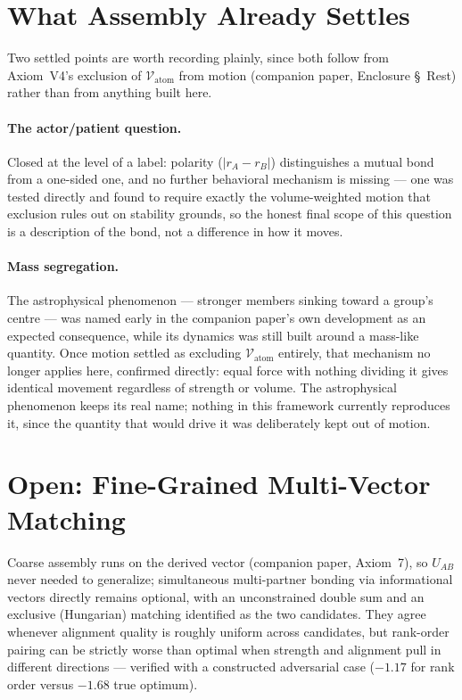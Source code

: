 \documentclass[12pt, a4paper]{article}
\begin{document}
\section{What Assembly Already Settles}
\label{sec:already_settled}

Two settled points are worth recording plainly, since both follow
from Axiom~V4's exclusion of $\mathcal{V}_{\text{atom}}$ from motion
(companion paper, Enclosure \S~Rest) rather than from anything built
here.

\paragraph{The actor/patient question.} Closed at the level of a
label: polarity ($\lvert r_A-r_B\rvert$) distinguishes a mutual bond
from a one-sided one, and no further behavioral mechanism is
missing --- one was tested directly and found to require exactly
the volume-weighted motion that exclusion rules out on stability
grounds, so the honest final scope of this question is a
description of the bond, not a difference in how it moves.

\paragraph{Mass segregation.} The astrophysical phenomenon ---
stronger members sinking toward a group's centre --- was named
early in the companion paper's own development as an expected
consequence, while its dynamics was still built around a mass-like
quantity. Once motion settled as excluding $\mathcal{V}_{\text{atom}}$
entirely, that mechanism no longer applies here, confirmed directly:
equal force with nothing dividing it gives identical movement
regardless of strength or volume. The astrophysical phenomenon keeps
its real name; nothing in this framework currently reproduces it,
since the quantity that would drive it was deliberately kept out of
motion.

\section{Open: Fine-Grained Multi-Vector Matching}
\label{sec:open_matching}

Coarse assembly runs on the derived vector (companion paper,
Axiom~7), so $U_{AB}$ never needed to generalize; simultaneous
multi-partner bonding via informational vectors directly remains
optional, with an unconstrained double sum and an exclusive
(Hungarian) matching identified as the two candidates. They agree
whenever alignment quality is roughly uniform across candidates, but
rank-order pairing can be strictly worse than optimal when strength
and alignment pull in different directions --- verified with a
constructed adversarial case ($-1.17$ for rank order versus $-1.68$
true optimum).
\end{document}
